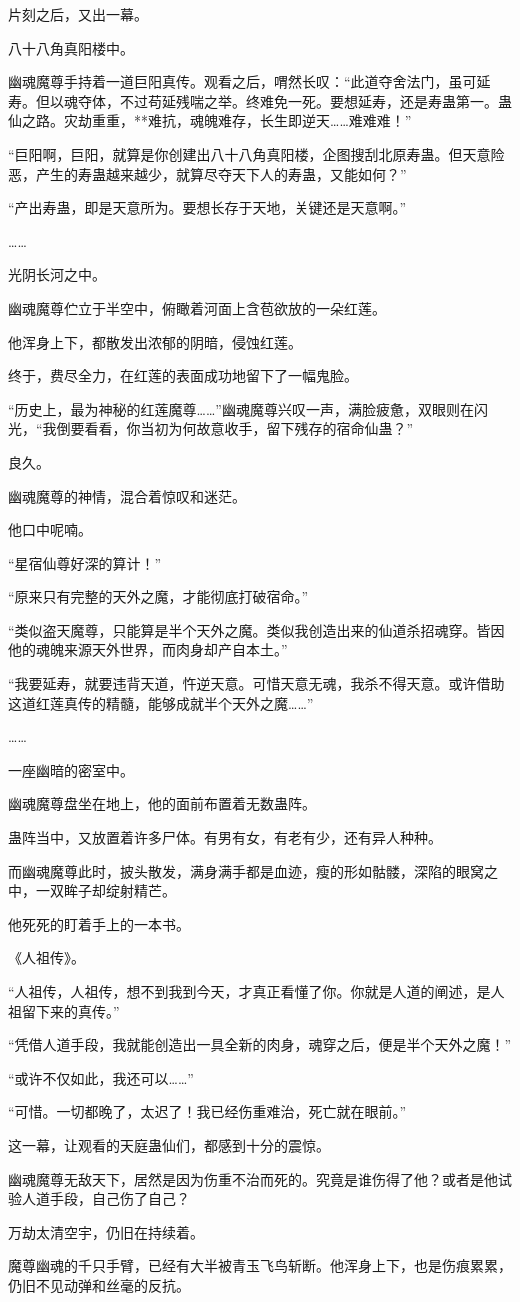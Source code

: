 \begin{this_body}
片刻之后，又出一幕。

八十八角真阳楼中。

幽魂魔尊手持着一道巨阳真传。观看之后，喟然长叹：“此道夺舍法门，虽可延寿。但以魂夺体，不过苟延残喘之举。终难免一死。要想延寿，还是寿蛊第一。蛊仙之路。灾劫重重，**难抗，魂魄难存，长生即逆天……难难难！”

“巨阳啊，巨阳，就算是你创建出八十八角真阳楼，企图搜刮北原寿蛊。但天意险恶，产生的寿蛊越来越少，就算尽夺天下人的寿蛊，又能如何？”

“产出寿蛊，即是天意所为。要想长存于天地，关键还是天意啊。”

……

光阴长河之中。

幽魂魔尊伫立于半空中，俯瞰着河面上含苞欲放的一朵红莲。

他浑身上下，都散发出浓郁的阴暗，侵蚀红莲。

终于，费尽全力，在红莲的表面成功地留下了一幅鬼脸。

“历史上，最为神秘的红莲魔尊……”幽魂魔尊兴叹一声，满脸疲惫，双眼则在闪光，“我倒要看看，你当初为何故意收手，留下残存的宿命仙蛊？”

良久。

幽魂魔尊的神情，混合着惊叹和迷茫。

他口中呢喃。

“星宿仙尊好深的算计！”

“原来只有完整的天外之魔，才能彻底打破宿命。”

“类似盗天魔尊，只能算是半个天外之魔。类似我创造出来的仙道杀招魂穿。皆因他的魂魄来源天外世界，而肉身却产自本土。”

“我要延寿，就要违背天道，忤逆天意。可惜天意无魂，我杀不得天意。或许借助这道红莲真传的精髓，能够成就半个天外之魔……”

……

一座幽暗的密室中。

幽魂魔尊盘坐在地上，他的面前布置着无数蛊阵。

蛊阵当中，又放置着许多尸体。有男有女，有老有少，还有异人种种。

而幽魂魔尊此时，披头散发，满身满手都是血迹，瘦的形如骷髅，深陷的眼窝之中，一双眸子却绽射精芒。

他死死的盯着手上的一本书。

《人祖传》。

“人祖传，人祖传，想不到我到今天，才真正看懂了你。你就是人道的阐述，是人祖留下来的真传。”

“凭借人道手段，我就能创造出一具全新的肉身，魂穿之后，便是半个天外之魔！”

“或许不仅如此，我还可以……”

“可惜。一切都晚了，太迟了！我已经伤重难治，死亡就在眼前。”

这一幕，让观看的天庭蛊仙们，都感到十分的震惊。

幽魂魔尊无敌天下，居然是因为伤重不治而死的。究竟是谁伤得了他？或者是他试验人道手段，自己伤了自己？

万劫太清空宇，仍旧在持续着。

魔尊幽魂的千只手臂，已经有大半被青玉飞鸟斩断。他浑身上下，也是伤痕累累，仍旧不见动弹和丝毫的反抗。

\end{this_body}

